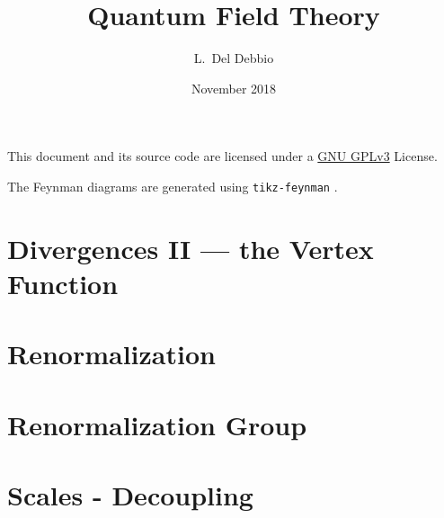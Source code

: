\documentclass[bibliography=totoc]{notes}
\title{Quantum Field Theory}
\author{L.~Del Debbio}
\date{November 2018}
\begin{document}
%
\maketitle
{}
\clearpage
\clearpage
\tableofcontents

\vspace{\fill}

This document and its source code are licensed under a \href{https://www.gnu.org/licenses/gpl-3.0.en.html}{GNU GPLv3} License.

The Feynman diagrams are generated using \texttt{tikz-feynman} \parencite{ELLIS2017103}.

\nocite{*}
\printbibliography[keyword=recommended,title={Recommended Textbooks},omitnumbers=true]





%






\chapter{Divergences II --- the Vertex Function}
\label{cha:diverg-ii-vert}


\chapter{Renormalization}
\label{cha:renormalization}
% 


\chapter{Renormalization Group}
\label{cha:renorm-group}

\chapter{Scales - Decoupling}
\label{cha:scales-decoupling}

\printindex
\printbibliography[notkeyword=recommended]
\end{document}

